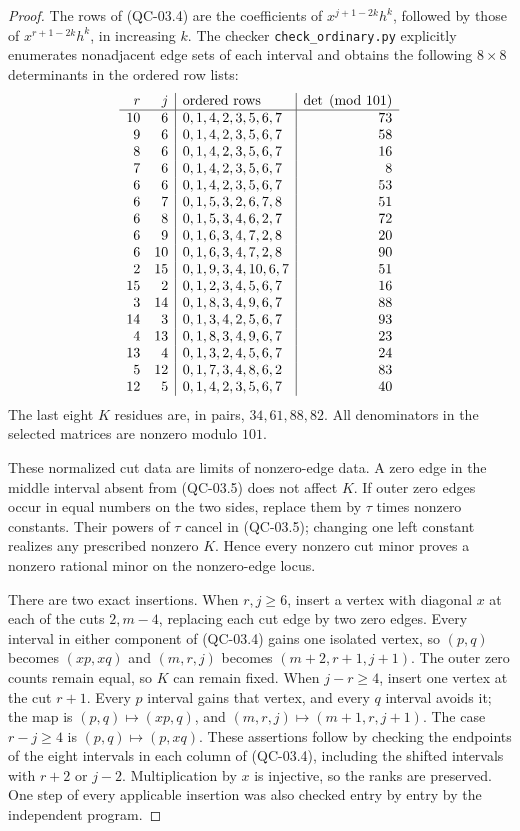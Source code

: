 \begin{proof}
The rows of (QC-03.4) are the coefficients of
$x^{j+1-2k}h^k$, followed by those of $x^{r+1-2k}h^k$, in
increasing $k$. The checker \texttt{check\_ordinary.py} explicitly
enumerates nonadjacent edge sets of each interval and obtains
the following $8\times8$ determinants in the ordered row lists:
\[
\begin{array}{r r|l|r}
r&j&\text{ordered rows}&\det\pmod{101}\\\hline
10&6&0,1,4,2,3,5,6,7&73\\
9&6&0,1,4,2,3,5,6,7&58\\
8&6&0,1,4,2,3,5,6,7&16\\
7&6&0,1,4,2,3,5,6,7&8\\
6&6&0,1,4,2,3,5,6,7&53\\
6&7&0,1,5,3,2,6,7,8&51\\
6&8&0,1,5,3,4,6,2,7&72\\
6&9&0,1,6,3,4,7,2,8&20\\
6&10&0,1,6,3,4,7,2,8&90\\
2&15&0,1,9,3,4,10,6,7&51\\
15&2&0,1,2,3,4,5,6,7&16\\
3&14&0,1,8,3,4,9,6,7&88\\
14&3&0,1,3,4,2,5,6,7&93\\
4&13&0,1,8,3,4,9,6,7&23\\
13&4&0,1,3,2,4,5,6,7&24\\
5&12&0,1,7,3,4,8,6,2&83\\
12&5&0,1,4,2,3,5,6,7&40
\end{array}
\]
The last eight $K$ residues are, in pairs, $34,61,88,82$.
All denominators in the selected matrices are nonzero modulo $101$.

These normalized cut data are limits of nonzero-edge data.
A zero edge in the middle interval absent from (QC-03.5) does not
affect $K$. If outer zero edges occur in equal numbers on the two
sides, replace them by $\tau$ times nonzero constants. Their
powers of $\tau$ cancel in (QC-03.5); changing one left constant
realizes any prescribed nonzero $K$. Hence every nonzero cut
minor proves a nonzero rational minor on the nonzero-edge locus.

There are two exact insertions. When $r,j\geq6$, insert a vertex
with diagonal $x$ at each of the cuts $2,m-4$, replacing each cut
edge by two zero edges. Every interval in either component of
(QC-03.4) gains one isolated vertex, so $(p,q)$ becomes $(xp,xq)$
and $(m,r,j)$ becomes $(m+2,r+1,j+1)$. The outer zero counts
remain equal, so $K$ can remain fixed. When $j-r\geq4$, insert
one vertex at the cut $r+1$. Every $p$ interval gains that vertex,
and every $q$ interval avoids it; the map is $(p,q)\mapsto(xp,q)$,
and $(m,r,j)\mapsto(m+1,r,j+1)$. The case $r-j\geq4$ is
$(p,q)\mapsto(p,xq)$. These assertions follow by checking the
endpoints of the eight intervals in each column of (QC-03.4),
including the shifted intervals with $r+2$ or $j-2$.
Multiplication by $x$ is injective, so the ranks are preserved.
One step of every applicable insertion was also checked entry by
entry by the independent program.


\end{proof}
